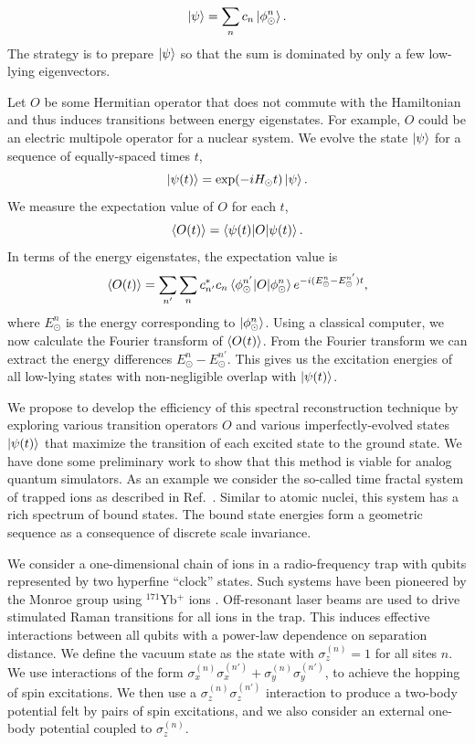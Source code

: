 \documentclass[10pt]{article}
\begin{document}
\begin{equation}
\ket{\psi} = \sum_n c_n \ket{\phi^n_\odot}.
\end{equation}The strategy is to prepare $\ket{\psi}$ so that the sum is dominated by only a few low-lying eigenvectors. 



Let $O$ be some Hermitian operator that does not commute with the Hamiltonian and thus induces  transitions between energy eigenstates.  For example, $O$ could be an electric multipole operator for a nuclear system. We evolve the state $\ket{\psi}$ for a sequence of equally-spaced times $t$,
\begin{equation}
\ket{\psi(t)} = \exp(-iH_{\odot}t) \ket{\psi}.
\end{equation}
We measure the expectation value of $O$ for each $t$, 
\begin{equation}
\braket{O(t)} = \braket{\psi(t)| O |\psi(t)}. 
\end{equation}
In terms of the energy eigenstates, the expectation value is 
\begin{equation}
\braket{O(t)} =   \sum_{n'}  \sum_n c^*_{n'} c_n \braket{\phi^{n'}_\odot|O|\phi^n_\odot}
e^{-i(E^{n}_\odot-E^{n'}_\odot)t},
\end{equation}
where $E^{n}_\odot$ is the energy corresponding to
$\ket{\phi^n_\odot}$.  Using a classical computer, we now calculate
the Fourier transform of $\braket{O(t)}$.  From the Fourier transform
we can extract the energy differences $E^{n}_\odot-E^{n'}_\odot$.
This gives us the excitation energies of all low-lying states with
non-negligible overlap with $\ket{\psi(t)}$.

We propose to develop the efficiency of this spectral reconstruction
technique by exploring various transition operators $O$ and various
imperfectly-evolved states $\ket{\psi(t)}$ that maximize the
transition of each excited state to the ground state.  We have done
some preliminary work to show that this method is viable for analog
quantum simulators.  As an example we consider the so-called time
fractal system of trapped ions as described in
Ref.~\cite{Lee:2019gtc}.  Similar to atomic nuclei, this system has a
rich spectrum of bound states.  The bound state energies form a
geometric sequence as a consequence of discrete scale invariance.


We consider a one-dimensional chain of ions in a radio-frequency trap
with qubits represented by two hyperfine ``clock'' states.  Such
systems have been pioneered by the Monroe group using $^{171}$Yb$^{+}$
ions \cite{Zhang:2017a,Zhang:2017b}.  Off-resonant laser beams are
used to drive stimulated Raman transitions for all ions in the trap.
This induces effective interactions between all qubits with a
power-law dependence on separation distance.  We define the vacuum
state as the state with $\sigma_z^{(n)}=1$ for all sites $n$.  We use
interactions of the form
$\sigma_x^{(n)}\sigma_x^{(n')}+\sigma_y^{(n)}\sigma_y^{(n')}$, to
achieve the hopping of spin excitations.  We then use a
$\sigma_z^{(n)}\sigma_z^{(n')}$ interaction to produce a two-body
potential felt by pairs of spin excitations, and we also consider an
external one-body potential coupled to $\sigma_z^{(n)}$.
\end{document}
